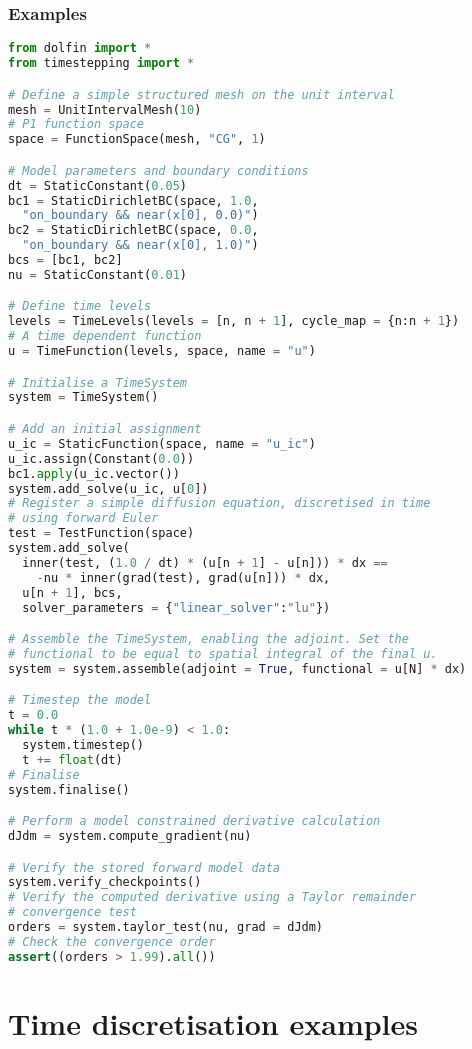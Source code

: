 \documentclass[a4paper]{book}
\begin{document}
\subsection*{Examples}

\begin{lstlisting}[language = python, frame = single, basicstyle=\footnotesize]
from dolfin import *
from timestepping import *

# Define a simple structured mesh on the unit interval
mesh = UnitIntervalMesh(10)
# P1 function space
space = FunctionSpace(mesh, "CG", 1)

# Model parameters and boundary conditions
dt = StaticConstant(0.05)
bc1 = StaticDirichletBC(space, 1.0,
  "on_boundary && near(x[0], 0.0)")
bc2 = StaticDirichletBC(space, 0.0,
  "on_boundary && near(x[0], 1.0)")
bcs = [bc1, bc2]
nu = StaticConstant(0.01)

# Define time levels
levels = TimeLevels(levels = [n, n + 1], cycle_map = {n:n + 1})
# A time dependent function
u = TimeFunction(levels, space, name = "u")

# Initialise a TimeSystem
system = TimeSystem()

# Add an initial assignment
u_ic = StaticFunction(space, name = "u_ic")
u_ic.assign(Constant(0.0))
bc1.apply(u_ic.vector())
system.add_solve(u_ic, u[0])
# Register a simple diffusion equation, discretised in time
# using forward Euler
test = TestFunction(space)
system.add_solve(
  inner(test, (1.0 / dt) * (u[n + 1] - u[n])) * dx ==
    -nu * inner(grad(test), grad(u[n])) * dx,
  u[n + 1], bcs,
  solver_parameters = {"linear_solver":"lu"})

# Assemble the TimeSystem, enabling the adjoint. Set the
# functional to be equal to spatial integral of the final u.
system = system.assemble(adjoint = True, functional = u[N] * dx)

# Timestep the model
t = 0.0
while t * (1.0 + 1.0e-9) < 1.0:
  system.timestep()
  t += float(dt)
# Finalise
system.finalise()

# Perform a model constrained derivative calculation
dJdm = system.compute_gradient(nu)

# Verify the stored forward model data
system.verify_checkpoints()
# Verify the computed derivative using a Taylor remainder
# convergence test
orders = system.taylor_test(nu, grad = dJdm)
# Check the convergence order
assert((orders > 1.99).all())
\end{lstlisting}

\chapter{Time discretisation examples}
\end{document}
